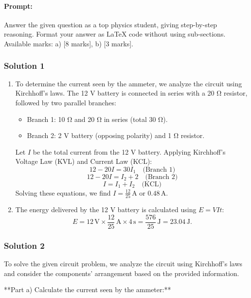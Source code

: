 \documentclass{article}
\begin{document}
\paragraph{Prompt: \\} 
Answer the given question as a top physics student, giving step-by-step reasoning. Format your answer as LaTeX code without using sub-sections. Available marks: a) [8 marks], b) [3 marks].

\subsubsection{Solution 1}
\begin{enumerate}
    \item To determine the current seen by the ammeter, we analyze the circuit using Kirchhoff's laws. The 12 V battery is connected in series with a 20 Ω resistor, followed by two parallel branches:
    \begin{itemize}
        \item Branch 1: 10 Ω and 20 Ω in series (total 30 Ω).
        \item Branch 2: 2 V battery (opposing polarity) and 1 Ω resistor.
    \end{itemize}
    Let \( I \) be the total current from the 12 V battery. Applying Kirchhoff's Voltage Law (KVL) and Current Law (KCL):
    \[
    12 - 20I = 30I_1 \quad \text{(Branch 1)}
    \]
    \[
    12 - 20I = I_2 + 2 \quad \text{(Branch 2)}
    \]
    \[
    I = I_1 + I_2 \quad \text{(KCL)}
    \]
    Solving these equations, we find \( I = \frac{12}{25} \, \text{A} \) or \( 0.48 \, \text{A} \).

    \item The energy delivered by the 12 V battery is calculated using \( E = VIt \):
    \[
    E = 12 \, \text{V} \times \frac{12}{25} \, \text{A} \times 4 \, \text{s} = \frac{576}{25} \, \text{J} = 23.04 \, \text{J}.
    \]
\end{enumerate}


\subsubsection{Solution 2}
To solve the given circuit problem, we analyze the circuit using Kirchhoff's laws and consider the components' arrangement based on the provided information.

**Part a) Calculate the current seen by the ammeter:**
\end{document}
